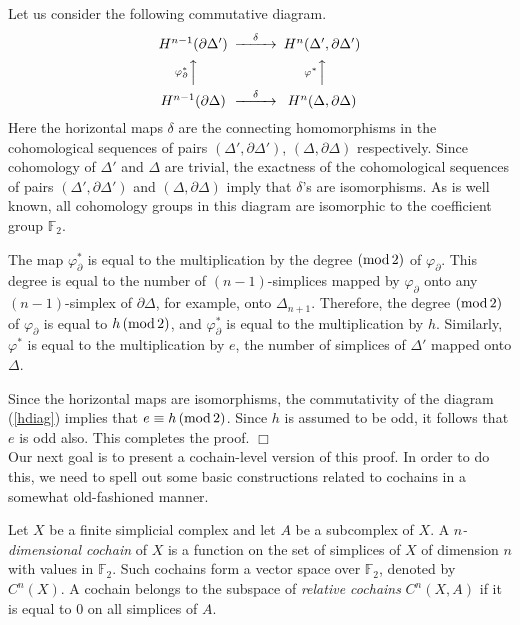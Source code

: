 \documentclass[leqno, 11pt]{article}\usepackage{latexsym}\usepackage{amsmath, amscd}\usepackage{amssymb}
\begin{document}
Let us consider the following commutative diagram.
\begin{equation}
\label{hdiag}
\begin{CD}
H^{n-1}(\partial\Delta') @>{\delta}>> H^n(\Delta',\partial\Delta')\\
@A{\varphi_{\partial}^*}AA @A{\varphi^*}AA\\
H^{n-1}(\partial\Delta) @>{\delta}>> H^n(\Delta,\partial\Delta)
\end{CD}
\end{equation}
Here the horizontal maps $\delta$ are the connecting homomorphisms in the cohomological sequences of pairs $(\Delta',\partial\Delta')$, $(\Delta,\partial\Delta)$ respectively. Since cohomology of $\Delta'$ and $\Delta$ are trivial, the exactness of the cohomological sequences of pairs $(\Delta',\partial\Delta')$ and $(\Delta,\partial\Delta)$ imply that $\delta$'s are isomorphisms. As is well known, all cohomology groups in this diagram are isomorphic to the coefficient group ${\mathbb F}_2$.
 
The map $\varphi_{\partial}^*$ is equal to the multiplication by the degree $({\rm mod}\, 2)$ of $\varphi_{\partial}$. This degree is equal to the number of 
$(n-1)$-simplices mapped by $\varphi_{\partial}$ onto any $(n-1)$-simplex of $\partial\Delta$, for example, onto $\Delta_{n+1}$. Therefore, the degree 
$({\rm mod}\, 2)$ of $\varphi_{\partial}$ is equal to $h\, ({\rm mod}\, 2)$, and $\varphi_{\partial}^*$ is equal to the multiplication by $h$. Similarly, 
$\varphi^*$ is equal to the multiplication by $e$, the number of simplices of $\Delta'$ mapped onto $\Delta$.

Since the horizontal maps are isomorphisms, the commutativity of the diagram (\ref{hdiag}) implies that $e\equiv h\, ({\rm mod}\, 2)$. Since $h$ is assumed to be odd, 
it follows that $e$ is odd also. This completes the proof. $\Box$\\
 
Our next goal is to present a cochain-level version of this proof. In order to do this, we need to spell out some basic constructions related to cochains in a somewhat old-fashioned manner.

Let $X$ be a finite simplicial complex and let $A$ be a subcomplex of $X$. 
A {\em $n$-dimensional cochain} of $X$ is a function on the set of simplices of $X$ of dimension $n$ with values in ${\mathbb F}_2$.
Such cochains form a vector space over ${\mathbb F}_2$, denoted by $C^n(X)$. A cochain belongs to the subspace of {\em relative cochains} $C^n(X,A)$ if it is equal to $0$ on all simplices of $A$.  
\end{document}
